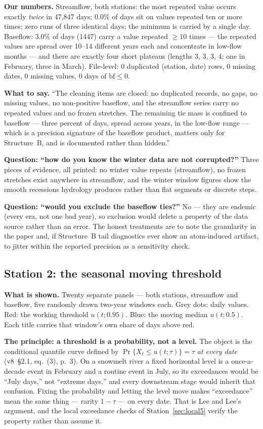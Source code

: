 \documentclass[11pt]{article}
\begin{document}
\textbf{Our numbers.} Streamflow, both stations: the most repeated value
occurs exactly \emph{twice} in 47{,}847 days; 0.0\% of days sit on values
repeated ten or more times; zero runs of three identical days; the minimum is
carried by a single day. Baseflow: 3.0\% of days (1447) carry a value repeated
$\ge 10$ times --- the repeated values are spread over 10--14 different years
each and concentrate in low-flow months --- and there are exactly four short
plateaus (lengths 3, 3, 3, 4; one in February, three in March). File-level:
0 duplicated (station, date) rows, 0 missing dates, 0 missing values, 0 days
of $\mathrm{bf} \le 0$.

\textbf{What to say.} ``The cleaning items are closed: no duplicated records,
no gaps, no missing values, no non-positive baseflow, and the streamflow
series carry no repeated values and no frozen stretches. The remaining tie
mass is confined to baseflow --- three percent of days, spread across years,
in the low-flow range --- which is a precision signature of the baseflow
product, matters only for Structure~B, and is documented rather than
hidden.''

\textbf{Question: ``how do you know the winter data are not corrupted?''}
Three pieces of evidence, all printed: no winter value repeats (streamflow),
no frozen stretches exist anywhere in streamflow, and the winter window
figures show the smooth recessions hydrology produces rather than flat
segments or discrete steps.

\textbf{Question: ``would you exclude the baseflow ties?''} No --- they are
endemic (every era, not one bad year), so exclusion would delete a property
of the data source rather than an error. The honest treatments are to note
the granularity in the paper and, if Structure~B tail diagnostics ever show
an atom-induced artifact, to jitter within the reported precision as a
sensitivity check.

\subsection{Station 2: the seasonal moving threshold}
\label{sec:threshold}

\textbf{What is shown.} Twenty separate panels --- both stations, streamflow
and baseflow, five randomly drawn two-year windows each. Grey dots: daily
values. Red: the working threshold $u(t; 0.95)$. Blue: the moving median
$u(t; 0.5)$. Each title carries that window's own share of days above red.

\textbf{The principle: a threshold is a probability, not a level.} The object
is the conditional quantile curve defined by
$\Pr\{X_t \le u(t;\tau)\} = \tau$ \emph{at every date} (v8~\S2.1, eq.~(3),
p.~3). On a snowmelt river a fixed horizontal level is a once-a-decade event
in February and a routine event in July, so its exceedances would be ``July
days,'' not ``extreme days,'' and every downstream stage would inherit that
confusion. Fixing the probability and letting the level move makes
``exceedance'' mean the same thing --- rarity $1-\tau$ --- on every date. That
is Lee and Lee's argument, and the local exceedance checks of
Station~\ref{sec:local5} verify the property rather than assume it.
\end{document}
